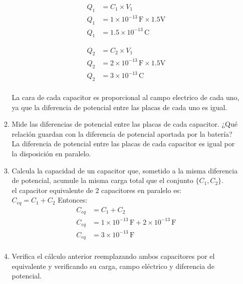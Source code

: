 \documentclass[12pt]{report}
\begin{document}
\begin{enumerate}
\begin{enumerate}
            \begin{align*}
            Q_1&= C_1 \times V_1\\[6pt]
            Q_1&= 1 \times 10^{-13} \,\text{F} \times 1.5 \text{V}\\[6pt]
            Q_1&= 1.5\times 10^{-13} \,\text{C}
            \end{align*}


            \begin{align*}
            Q_2&= C_2 \times V_1\\[6pt]
            Q_2&= 2 \times 10^{-13} \,\text{F} \times 1.5 \text{V}\\[6pt]
            Q_2&= 3\times 10^{-13} \,\text{C}\\[12pt] 
            \end{align*}

            La cara de cada capacitor es proporcional al campo electrico de cada uno, ya que la diferencia de potencial entre las placas de cada uno es igual.\\

        \item Mide las diferencias de potencial entre las placas de cada capacitor. ¿Qué relación guardan con la diferencia de potencial aportada por la batería?\\[6pt]
            La diferencia de potencial entre las placas de cada capacitor es igual por la disposición en paralelo.\\

\newpage

        \item Calcula la capacidad de un capacitor que, sometido a la misma diferencia de potencial, acumule la misma carga total que el conjunto $\{C_1, C_2\}$.\\[6pt]
            el capacitor equivalente de 2 capacitores en paralelo es:\\
            $C_{eq}=C_1+C_2$ Entonces:\\

            \begin{align*}
                C_{eq}&=C_1+C_2\\[6pt]
                C_{eq}&= 1 \times 10^{-13} \, \text{F} +  2 \times 10^{-13} \, \text{F}\\[6pt]
                C_{eq}&= 3\times 10^{-13} \, \text{F}\\[12pt]
            \end{align*}


        \item Verifica el cálculo anterior reemplazando ambos capacitores por el equivalente y verificando su carga, campo eléctrico y diferencia de potencial.


\end{enumerate}
\end{enumerate}
\end{document}

